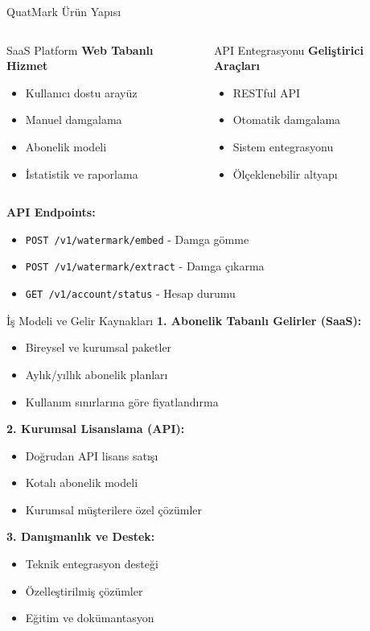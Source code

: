 \documentclass[aspectratio=169,xcolor={dvipsnames}]{beamer}
\begin{document}
\begin{frame}{QuatMark Ürün Yapısı}
\begin{columns}
\begin{block}{SaaS Platform}
\textbf{Web Tabanlı Hizmet}
\begin{itemize}
\item Kullanıcı dostu arayüz
\item Manuel damgalama
\item Abonelik modeli
\item İstatistik ve raporlama
\end{itemize}
\end{block}

\begin{block}{API Entegrasyonu}
\textbf{Geliştirici Araçları}
\begin{itemize}
\item RESTful API
\item Otomatik damgalama
\item Sistem entegrasyonu
\item Ölçeklenebilir altyapı
\end{itemize}
\end{block}
\end{columns}

\vspace{0.5cm}

\textbf{API Endpoints:}
\begin{itemize}
\item \texttt{POST /v1/watermark/embed} - Damga gömme
\item \texttt{POST /v1/watermark/extract} - Damga çıkarma
\item \texttt{GET /v1/account/status} - Hesap durumu
\end{itemize}
\end{frame}

\begin{frame}{İş Modeli ve Gelir Kaynakları}
\textbf{1. Abonelik Tabanlı Gelirler (SaaS):}
\begin{itemize}
\item Bireysel ve kurumsal paketler
\item Aylık/yıllık abonelik planları
\item Kullanım sınırlarına göre fiyatlandırma
\end{itemize}

\textbf{2. Kurumsal Lisanslama (API):}
\begin{itemize}
\item Doğrudan API lisans satışı
\item Kotalı abonelik modeli
\item Kurumsal müşterilere özel çözümler
\end{itemize}

\textbf{3. Danışmanlık ve Destek:}
\begin{itemize}
\item Teknik entegrasyon desteği
\item Özelleştirilmiş çözümler
\item Eğitim ve dokümantasyon
\end{itemize}
\end{frame}
\end{document}
